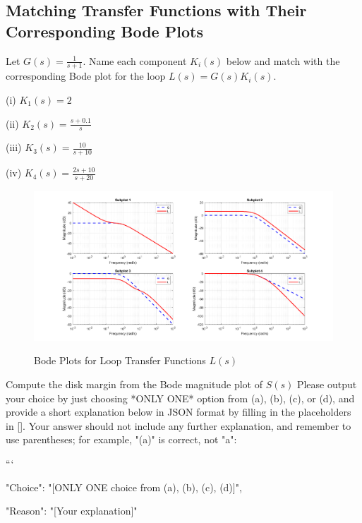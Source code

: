 \documentclass[12pt]{article}
\begin{document}
\subsection{Matching Transfer Functions with Their Corresponding Bode Plots}

Let \(G(s) = \frac{1}{s+1}\). Name each component \(K_i(s)\) below and match with the corresponding Bode plot for the loop \(L(s) = G(s) K_i(s)\).

\begin{enumerate*}
    \item[(i)] \(K_1(s) = 2\)
    \item[(ii)] \(K_2(s) = \frac{s+0.1}{s}\)
    \item[(iii)] \(K_3(s) = \frac{10}{s+10}\)
    \item[(iv)] \(K_4(s) = \frac{2s+10}{s+20}\)
\end{enumerate*}


\begin{figure}[h]
        \centering
        \includegraphics[width=\textwidth]{figs/6.7.png}
        \label{fig:nyquist_92}
        \caption{Bode Plots for Loop Transfer Functions \(L(s)\)}
\end{figure}

Compute the disk margin from the Bode magnitude plot of $S(s)$ 
Please output your choice by just choosing *ONLY ONE* option from (a), (b), (c), or (d), and provide a short explanation below in JSON format by filling in the placeholders in []. Your answer should not include any further explanation, and remember to use parentheses; for example, "(a)" is correct, not "a":

```
{

"Choice": "[ONLY ONE choice from (a), (b), (c), (d)]",

"Reason": "[Your explanation]"

}
\end{document}
